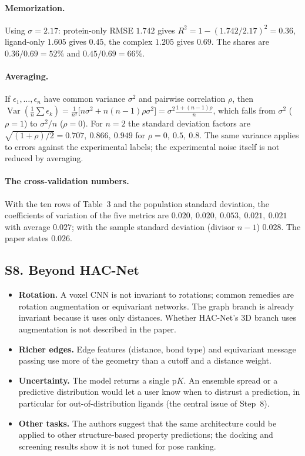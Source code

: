\documentclass[11pt]{article}
\newcommand{\pK}{\mathrm{p}K}
\DeclareMathOperator{\Var}{Var}
\begin{document}
\paragraph{Memorization.} Using $\sigma=2.17$: protein-only RMSE $1.742$ gives $R^2=1-(1.742/2.17)^2=0.36$, ligand-only $1.605$ gives $0.45$, the complex $1.205$ gives $0.69$. The shares are $0.36/0.69=52\%$ and $0.45/0.69=66\%$.

\paragraph{Averaging.} If $\epsilon_1,\dots,\epsilon_n$ have common variance $\sigma^2$ and pairwise correlation $\rho$, then $\Var(\frac1n\sum\epsilon_k)=\frac1{n^2}\big[n\sigma^2+n(n-1)\rho\sigma^2\big]=\sigma^2\frac{1+(n-1)\rho}n$, which falls from $\sigma^2$ ($\rho=1$) to $\sigma^2/n$ ($\rho=0$). For $n=2$ the standard deviation factors are $\sqrt{(1+\rho)/2}=0.707,\ 0.866,\ 0.949$ for $\rho=0,\ 0.5,\ 0.8$. The same variance applies to errors against the experimental labels; the experimental noise itself is not reduced by averaging.

\paragraph{The cross-validation numbers.} With the ten rows of Table~3 and the population standard deviation, the coefficients of variation of the five metrics are $0.020,\ 0.020,\ 0.053,\ 0.021,\ 0.021$ with average $0.027$; with the sample standard deviation (divisor $n-1$) $0.028$. The paper states $0.026$.

\label{sec:S8}
\subsection*{S8. Beyond HAC-Net}
\begin{itemize}[nosep]
  \item \textbf{Rotation.} A voxel CNN is not invariant to rotations; common remedies are rotation augmentation or equivariant networks. The graph branch is already invariant because it uses only distances. Whether HAC-Net's 3D branch uses augmentation is not described in the paper.
  \item \textbf{Richer edges.} Edge features (distance, bond type) and equivariant message passing use more of the geometry than a cutoff and a distance weight.
  \item \textbf{Uncertainty.} The model returns a single $\pK$. An ensemble spread or a predictive distribution would let a user know when to distrust a prediction, in particular for out-of-distribution ligands (the central issue of Step~8).
  \item \textbf{Other tasks.} The authors suggest that the same architecture could be applied to other structure-based property predictions; the docking and screening results show it is not tuned for pose ranking.
\end{itemize}
\end{document}
